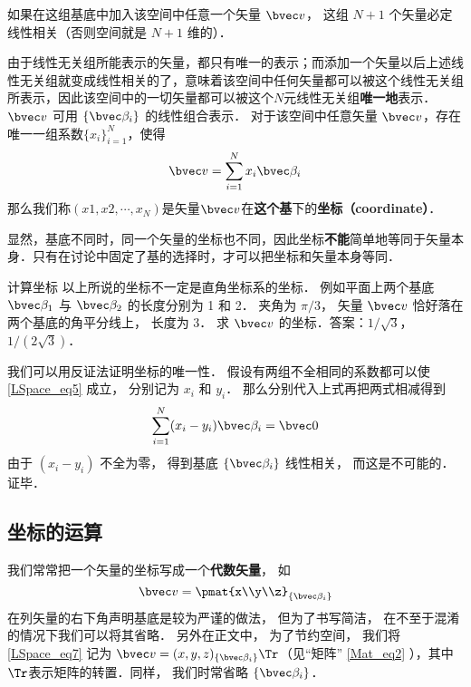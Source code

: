 如果在这组基底中加入该空间中任意一个矢量 $\bvec v$， 这组 $N+1$ 个矢量必定线性相关（否则空间就是 $N+1$ 维的）．

由于线性无关组所能表示的矢量，都只有唯一的表示；而添加一个矢量以后上述线性无关组就变成线性相关的了，意味着该空间中任何矢量都可以被这个线性无关组所表示，因此该空间中的一切矢量都可以被这个$N$元线性无关组\textbf{唯一地}表示．$\bvec v$ 可用 $\{\bvec \beta_i\}$ 的线性组合表示． 对于该空间中任意矢量 $\bvec v$，存在唯一一组系数$\{x_i\}_{i=1}^N$，使得
\begin{equation}\label{LSpace_eq5}
\bvec v = \sum_{i=1}^N x_i \bvec \beta_i
\end{equation}
那么我们称$(x1, x2, \cdots, x_N)$是矢量$\bvec v$在\textbf{这个基}下的\textbf{坐标（coordinate）}．

显然，基底不同时，同一个矢量的坐标也不同，因此坐标\textbf{不能}简单地等同于矢量本身．只有在讨论中固定了基的选择时，才可以把坐标和矢量本身等同．

\begin{exercise}{计算坐标}
以上所说的坐标不一定是直角坐标系的坐标． 例如平面上两个基底 $\bvec \beta_1$ 与 $\bvec \beta_2$ 的长度分别为 1 和 2． 夹角为 $\pi/3$， 矢量 $\bvec v$ 恰好落在两个基底的角平分线上， 长度为 3． 求 $\bvec v$ 的坐标．答案：$1/\sqrt 3$， $1/(2\sqrt 3)$．
\end{exercise}

我们可以用反证法证明坐标的唯一性． 假设有两组不全相同的系数都可以使\autoref{LSpace_eq5} 成立， 分别记为 $x_i$ 和 $y_i$． 那么分别代入上式再把两式相减得到
\begin{equation}
\sum_{i=1}^N (x_i-y_i) \bvec \beta_i = \bvec 0
\end{equation}
由于 $(x_i-y_i)$ 不全为零， 得到基底 $\{\bvec \beta_i\}$ 线性相关， 而这是不可能的．证毕．

\subsection{坐标的运算}
我们常常把一个矢量的坐标写成一个\textbf{代数矢量}， 如
\begin{equation}\label{LSpace_eq7}
\bvec v = \pmat{x\\y\\z}_{\{\bvec\beta_i\}}
\end{equation}
在列矢量的右下角声明基底是较为严谨的做法， 但为了书写简洁， 在不至于混淆的情况下我们可以将其省略． 另外在正文中， 为了节约空间， 我们将\autoref{LSpace_eq7} 记为 $\bvec v = (x, y, z)_{\{\bvec\beta_i\}}\Tr$（见“矩阵” \autoref{Mat_eq2} ），其中$\Tr$表示矩阵的转置．同样， 我们时常省略 $\{\bvec\beta_i\}$．

